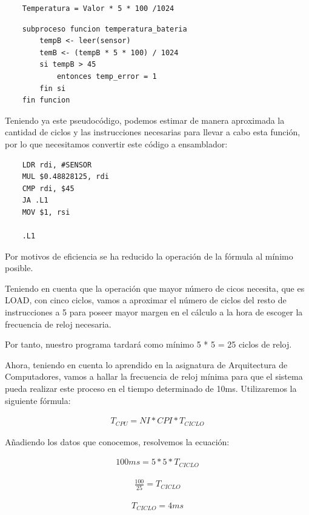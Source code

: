 \begin{verbatim}
    Temperatura = Valor * 5 * 100 /1024
\end{verbatim}


\begin{verbatim}
    subproceso funcion temperatura_bateria
        tempB <- leer(sensor)
        temB <- (tempB * 5 * 100) / 1024
        si tempB > 45
            entonces temp_error = 1
        fin si
    fin funcion
\end{verbatim}

Teniendo ya este pseudocódigo, podemos estimar de manera aproximada la cantidad de ciclos y las instrucciones necesarias para llevar a cabo esta función, por lo que necesitamos convertir este código a ensamblador: 

\begin{verbatim}
    LDR rdi, #SENSOR 
    MUL $0.48828125, rdi
    CMP rdi, $45
    JA .L1
    MOV $1, rsi

    .L1
\end{verbatim}

Por motivos de eficiencia se ha reducido la operación de la fórmula al mínimo posible. 

Teniendo en cuenta que la operación que mayor número de cicos necesita, que es LOAD, con cinco ciclos, vamos a aproximar el número de ciclos del resto de instrucciones a 5 para poseer mayor margen en el cálculo a la hora de escoger la frecuencia de reloj necesaria.

Por tanto, nuestro programa tardará como mínimo 5 * 5 = 25 ciclos de reloj.

Ahora, teniendo en cuenta lo aprendido en la asignatura de Arquitectura de Computadores, vamos a hallar la frecuencia de reloj mínima para que el sistema pueda realizar este proceso en el tiempo determinado de 10ms. Utilizaremos la siguiente fórmula: 

\begin{align*}
    T_{CPU} = NI * CPI * T_{CICLO}
\end{align*}

Añadiendo los datos que conocemos, resolvemos la ecuación:

\begin{align*}
    100ms = 5 * 5 * T_{CICLO} 
\end{align*}

\begin{align*}
    \frac{100}{25} = T_{CICLO}
\end{align*}


\begin{align*}
    T_{CICLO} = 4ms
\end{align*}

